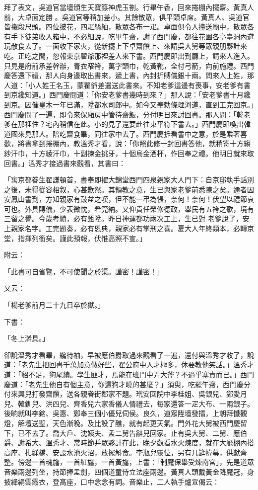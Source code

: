 \begin{showcontents}{}
拜了表文，吳道官當壇頒生天寶籙神虎玉劄。行畢午香，回來捲棚內擺齋。黃真人前，大卓面定勝 。吳道官等稍加差小。其餘散眾，俱平頭卓席。黃真人、吳道官皆襯段尺頭。四位披花，四疋絲紬，散眾各布一疋。卓面俱令人擡送廟中，散眾各有手下徒弟收入箱中，不必細說，吃畢午齋，謝了西門慶，都往花園各亭臺洞內遊玩散食去了。一面收下家火，從新擺上下卓齋饌上、來請吳大舅等眾親朋夥計來吃。正吃之間，忽報東京翟爺那裡差人來下書。西門慶即出到廳上，請來人進入。只見是府前承差幹辦，青衣窄袴，萬字頭巾，乾黃靴，全付弓箭，向前施禮。西門慶答還下禮，那人向身邊取出書來，遞上書，內封折賻儀銀十兩。問來人上姓，那人道：「小人姓王名玉，蒙翟爺差遣送此書來。不知老爹這邊有喪事，安老爹有書到京纔知道。」西門慶問道：「你安老爹書幾時到來？」那人說：「安老爹書十月纔到京。因催皇木一年已滿，陞都水司郎中。如今又奉勅條理河道，直到工完回京。」西門慶問了一遍，即令來保廂房中管待齋飯，分付明日來討回書。那人問：「韓老爹在那裡住？宅內稍信在此。小的見了還要赴往東平符下書去。」西門慶即喚出韓道國來見那人。陪吃齋食畢，同往家中去了。西門慶拆看書中之意，於是乘著喜歡，將書拿到捲棚內，教溫秀才看，說：「你照此修一封回書答他，就稍寄十方縐紗汗巾，十方綾汗巾，十副揀金挑牙，十個烏金酒杯，作回奉之禮。他明日就來取回書。」溫秀才接過書來觀看，其書曰：

「寓京都眷生翟謙頓首，書奉即擢大錦堂西門四泉親家大人門下：自京邸執手話別之後，未得從容相叙，心甚歉然。其領教之意，生已與家老爹前悉陳之矣。邇者因安鳳山書到，方知親家有鼓盆之嘆，但不能一弔為悵，奈何！奈何！伏望以禮節哀可也。外具賻儀，少表微忱，希筦納。又仰貴任榮修德政，舉民有五袴之歌，境有三留之譽。今歲考績，必有甄陞。昨日神運都功兩次工上，生已對 老爹說了，安上親家名字。工完題奏，必有恩典，親家必有掌刑之喜。夏大人年終類本，必轉京堂，指揮列銜矣。謹此預報，伏惟高照不宣。」

附云：

「此書可自省覽，不可使聞之於渠。謹密！謹密！」

又云：

「楊老爹前月二十九日卒於獄。」

下書：

「冬上澣具。」

卻說溫秀才看畢，纔待袖，早被應伯爵取過來觀看了一遍，還付與溫秀才收了，說道：「老先生把回書千萬加意做好些，翟公府中人才極多，休要教他笑話。」溫秀才道：「貂不足，狗尾續。學生匪才，焉能在班門中弄大斧？不過乎塞責而已。」西門慶道：「老先生他自有個主意，你這狗才曉的甚麼？」須臾，吃罷午齋，西門慶分付來興兒打發齋饌，送各親眷街鄰家不題。玳安回院中李桂姐、吳銀兒、鄭愛月兒、韓釧兒、洪四兒、齊香兒六家香儀人情禮去，每家還答一疋大布、一兩銀子。後晌就叫李銘、吳惠、鄭奉三個小優兒伺侯。良久，道眾陞壇發擂，上朝拜懺觀燈，解壇送聖，天色漸晚。及比設了醮，就有起更天氣。門外花大舅被西門慶留下，已不去了。喬大戶、沈姨夫、孟二舅告辭兒回家。止有吳大舅、二舅、應伯爵、謝希大、溫秀才、常時節并眾夥計在此，晚夕觀看水火煉度，就在大廳棚內搭高座、扎綵橋、安設水池火沼，放擺斛食。李瓶兒靈位，另有几筵幃幕，供獻齊整。傍邊一首魂旛，一首紅旛，一首黃旛，上書：「制魔保舉受煉南宮」，先是道眾音樂兩邊列坐，持節捧盂劍，四個道童侍立法座兩邊。黃真人頭戴黃金降魔冠，身披絳絹雲霞衣，登高座，口中念念有詞。音樂止，二人執手爐宣偈云：


\end{showcontents}
